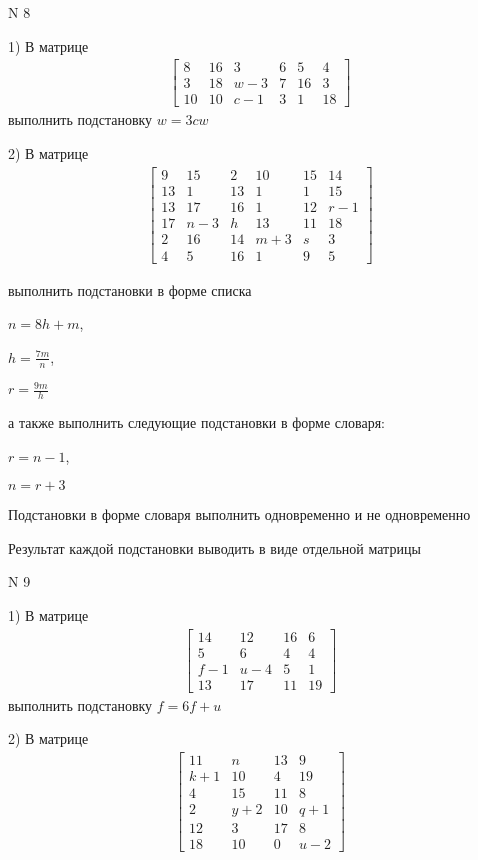 \documentclass[11pt]{report}
\begin{document}
\newpage
N 8


    1) В матрице
\begin{align*}
\left[\begin{matrix}8 & 16 & 3 & 6 & 5 & 4\\3 & 18 & w - 3 & 7 & 16 & 3\\10 & 10 & c - 1 & 3 & 1 & 18\end{matrix}\right]
\end{align*}
выполнить подстановку $w=3 c w$


    2) В матрице
\begin{align*}
\left[\begin{matrix}9 & 15 & 2 & 10 & 15 & 14\\13 & 1 & 13 & 1 & 1 & 15\\13 & 17 & 16 & 1 & 12 & r - 1\\17 & n - 3 & h & 13 & 11 & 18\\2 & 16 & 14 & m + 3 & s & 3\\4 & 5 & 16 & 1 & 9 & 5\end{matrix}\right]
\end{align*}

выполнить подстановки в форме списка

$n=8 h + m$,

$h=\frac{7 m}{n}$,

$r=\frac{9 m}{h}$

а также выполнить следующие подстановки в форме словаря:

$r=n - 1$,

$n=r + 3$


    Подстановки в форме словаря выполнить одновременно и не одновременно


    Результат каждой подстановки выводить в виде отдельной матрицы

\newpage
N 9


    1) В матрице
\begin{align*}
\left[\begin{matrix}14 & 12 & 16 & 6\\5 & 6 & 4 & 4\\f - 1 & u - 4 & 5 & 1\\13 & 17 & 11 & 19\end{matrix}\right]
\end{align*}
выполнить подстановку $f=6 f + u$


    2) В матрице
\begin{align*}
\left[\begin{matrix}11 & n & 13 & 9\\k + 1 & 10 & 4 & 19\\4 & 15 & 11 & 8\\2 & y + 2 & 10 & q + 1\\12 & 3 & 17 & 8\\18 & 10 & 0 & u - 2\end{matrix}\right]
\end{align*}
\end{document}

